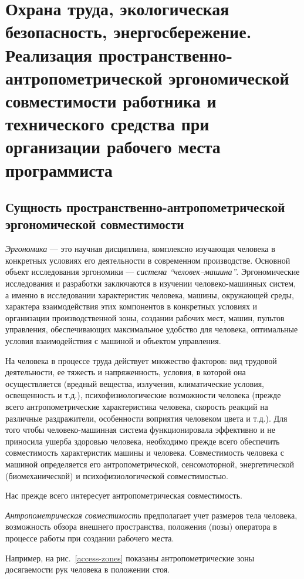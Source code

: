 \section{Охрана труда, экологическая безопасность, энергосбережение. Реализация пространственно\hyp{}антропометрической эргономической совместимости работника и технического средства при организации рабочего места программиста}

\subsection{Сущность пространственно\hyp{}антропометрической эргономической совместимости}
\emph{Эргономика} --- это научная дисциплина, комплексно изучающая человека в конкретных условиях его деятельности в современном производстве. Основной объект исследования эргономики --- \emph{система ``человек--машина''}. Эргономические исследования и разработки заключаются в изучении человеко\hyp{}машинных систем, а именно в исследовании характеристик человека, машины, окружающей среды, характера взаимодействия этих компонентов в конкретных условиях и организации производственной зоны, создании рабочих мест, машин, пультов управления, обеспечивающих максимальное удобство для человека, оптимальные условия взаимодействия с машиной и объектом управления.

На человека в процессе труда действует множество факторов: вид трудовой деятельности, ее тяжесть и напряженность, условия, в которой она осуществляется (вредный вещества, излучения, климатические условия, освещенность и т.д.), психофизиологические возможности человека (прежде всего антропометрические характеристика человека, скорость реакций на различные раздражители, особенности воприятия человеком цвета и т.д.). Для того чтобы человеко\hyp{}машинная система функционировала эффективно и не приносила ушерба здоровью человека, необходимо прежде всего обеспечить совместимость характеристик машины и человека. Совместимость человека с машиной определяется его антропометрической, сенсомоторной, энергетической (биомеханической) и психофизиологической совместимостью.

Нас прежде всего интересует антропометрическая совместимость.

\emph{Антропометрическая совместимость} предполагает учет размеров тела человека, возможность обзора внешнего пространства, положения (позы) оператора в процессе работы при создании рабочего места.

Например, на рис.~\ref{access-zones} показаны антропометрические зоны досягаемости рук человека в положении стоя.

